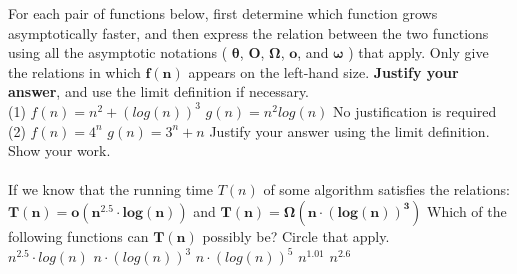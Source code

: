 \documentclass{exam}
\begin{document}
    \noindent
     For each pair of functions below, first
    determine which function grows asymptotically faster, and then express
    the relation between the two functions using all the asymptotic
    notations (%
        $\boldsymbol{\theta}$,
        $\boldsymbol{   O  }$,
        $\boldsymbol{\Omega}$,
        $\boldsymbol{   o  }$,
        and
        $\boldsymbol{\omega}$%
    )
    that apply. Only give the relations in which $\boldsymbol{f(n)}$
    appears on the left-hand size. \textbf{Justify your answer}, and
    use the limit definition if necessary.\\
    {
        \indent (1)
        \indent $f(n) = n^2 + (log(n))^3$
        \indent $g(n) = n^2 log(n)$
        \indent No justification is required
    }
    \vspace{1in} \\
    {
        \indent (2)
        \indent $f(n) = 4^n$
        \indent $g(n) = 3^n + n$
        \indent Justify your answer using the limit definition.
        Show your work.
    }
    \\
    \\
    \noindent
     If we know that the running time $T(n)$ of
    some algorithm satisfies the relations:
    $\boldsymbol{T(n) = o(n^{2.5} \cdot log(n))}$
    and
    $\boldsymbol{T(n) = \Omega( n \cdot (log(n))^3 )}$
    Which of the following functions can $\boldsymbol{T(n)}$ possibly
    be? Circle  that apply.\\
    {
        \indent
        $n^{2.5} \cdot log(n)$
        \hfill
        $n \cdot (log(n))^3$
        \hfill
        $n \cdot (log(n))^5$
        \hfill
        $n^{1.01}$
        \hfill
        $n^{2.6}$
        \indent
    }
\end{document}

